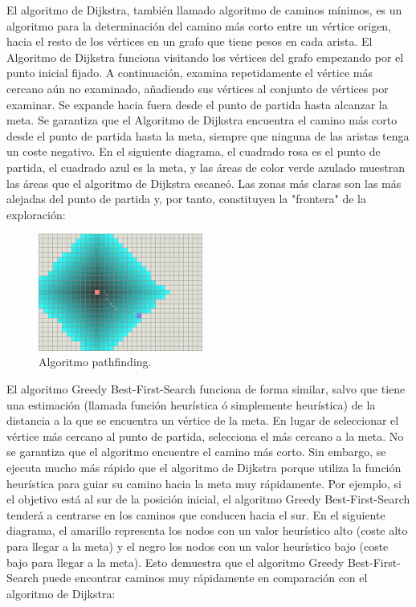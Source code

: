\documentclass[reprint,amsmath,amssymb,aps]{revtex4-2}
\begin{document}
% 

El algoritmo de Dijkstra, también llamado algoritmo de caminos mínimos, es un algoritmo para la determinación del camino más corto entre un vértice origen, hacia el resto de los vértices en un grafo que tiene pesos en cada arista. El Algoritmo de Dijkstra funciona visitando los vértices del grafo empezando por el punto inicial fijado. A continuación, examina repetidamente el vértice más cercano aún no examinado, añadiendo sus vértices al conjunto de vértices por examinar. Se expande hacia fuera desde el punto de partida hasta alcanzar la meta. Se garantiza que el Algoritmo de Dijkstra encuentra el camino más corto desde el punto de partida hasta la meta, siempre que ninguna de las aristas tenga un coste negativo. En el siguiente diagrama, el cuadrado rosa es el punto de partida, el cuadrado azul es la meta, y las áreas de color verde azulado muestran las áreas que el algoritmo de Dijkstra escaneó. Las zonas más claras son las más alejadas del punto de partida y, por tanto, constituyen la "frontera" de la exploración:

\begin{figure}[H]
 	\centering
 	\includegraphics[width=0.48\textwidth]{dijkstra.png}
 	\caption{Algoritmo pathfinding.}
 	\label{dijkstra}
\end{figure}

El algoritmo Greedy Best-First-Search funciona de forma similar, salvo que tiene una estimación (llamada función heurística ó simplemente heurística) de la distancia a la que se encuentra un vértice de la meta. En lugar de seleccionar el vértice más cercano al punto de partida, selecciona el más cercano a la meta. No se garantiza que el algoritmo encuentre el camino más corto. Sin embargo, se ejecuta mucho más rápido que el algoritmo de Dijkstra porque utiliza la función heurística para guiar su camino hacia la meta muy rápidamente. Por ejemplo, si el objetivo está al sur de la posición inicial, el algoritmo Greedy Best-First-Search tenderá a centrarse en los caminos que conducen hacia el sur. En el siguiente diagrama, el amarillo representa los nodos con un valor heurístico alto (coste alto para llegar a la meta) y el negro los nodos con un valor heurístico bajo (coste bajo para llegar a la meta). Esto demuestra que el algoritmo Greedy Best-First-Search puede encontrar caminos muy rápidamente en comparación con el algoritmo de Dijkstra:
\end{document}
